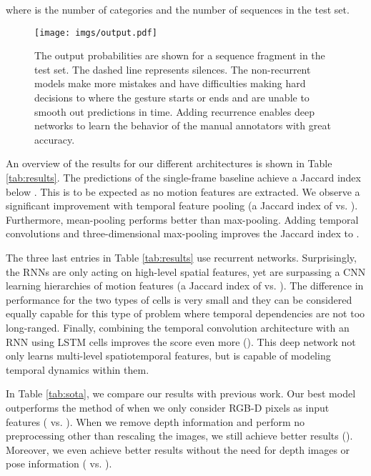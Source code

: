 \documentclass[11pt,a4paper]{article} \usepackage{a4wide}
\begin{document}
where  is the number of categories and  the number of sequences in the test set. 






\begin{figure}[t]
\begin{center}
\texttt{[image: imgs/output.pdf]}
\end{center}
\caption{The output probabilities are shown for a sequence fragment in the test set. The dashed line represents silences. The non-recurrent models make more mistakes and have difficulties making hard decisions to where the gesture starts or ends and are unable to smooth out predictions in time. Adding recurrence enables deep networks to learn the behavior of the manual annotators with great accuracy.}
\label{fig:classprob}
\end{figure}



An overview of the results for our different architectures is shown in Table \ref{tab:results}. The predictions of the single-frame baseline achieve a Jaccard index below . This is to be expected as no motion features are extracted. We observe a significant improvement with temporal feature pooling (a Jaccard index of  vs. ). 
Furthermore, mean-pooling performs better than max-pooling. 
Adding temporal convolutions and three-dimensional max-pooling improves the Jaccard index to . 




The three last entries in Table \ref{tab:results} use recurrent networks. Surprisingly, the RNNs are only acting on high-level spatial features, yet are surpassing a CNN learning hierarchies of motion features (a Jaccard index of  vs. ). The difference in performance for the two types of cells is very small and they can be considered equally capable for this type of problem where temporal dependencies are not too long-ranged. Finally, combining the temporal convolution architecture with an RNN using LSTM cells improves the score even more (). This deep network not only learns multi-level spatiotemporal features, but is capable of modeling temporal dynamics within them.

In Table \ref{tab:sota}, we compare our results with previous work.  Our best model outperforms the method of \cite{neverova2014moddrop} when we only consider RGB-D pixels as input features ( vs. ). When we remove depth information and perform no preprocessing other than rescaling the images, we still achieve better results (). 
Moreover, we even achieve better results without the need for depth images or pose information ( vs. ). 
\end{document}
